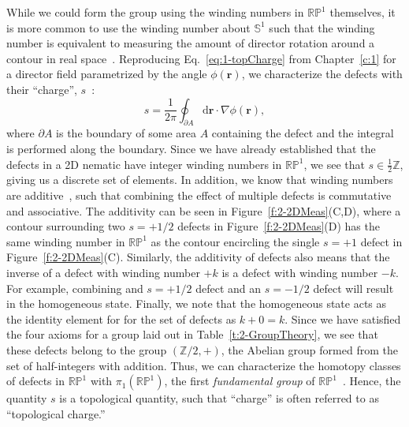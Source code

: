 While we could form the group using the winding numbers in $\mathbb{R}\mathbb{P}^1$ themselves, it is more common to use the winding number about $\mathbb{S}^1$ such that the winding number is equivalent to measuring the amount of director rotation around a contour in real space~\cite{RN23,RN153,RN203}.
Reproducing Eq.~\ref{eq:1-topCharge} from Chapter~\ref{c:1} for a director field parametrized by the angle $\phi(\mathbf{r})$, we characterize the defects with their ``charge'', $s$~\cite{RN153,RN236}:
\begin{equation}
  s = \frac{1}{2 \pi}\oint_{\partial A} \textrm{d}\mathbf{r} \cdot \nabla\phi(\mathbf{r}),\label{eq:2-topCharge}
\end{equation}
where $\partial A$ is the boundary of some area $A$ containing the defect and the integral is performed along the boundary.
Since we have already established that the defects in a 2D nematic have integer winding numbers in $\mathbb{R}\mathbb{P}^1$, we see that $s \in \frac{1}{2} \mathbb{Z}$, giving us a discrete set of elements.
In addition, we know that winding numbers are additive~\cite{RN196}, such that combining the effect of multiple defects is commutative and associative.
The additivity can be seen in Figure~\ref{f:2-2DMeas}(C,D), where a contour surrounding two $s = +1/2$ defects in Figure~\ref{f:2-2DMeas}(D) has the same winding number in $\mathbb{R}\mathbb{P}^1$ as the contour encircling the single $s = +1$ defect in Figure~\ref{f:2-2DMeas}(C).
Similarly, the additivity of defects also means that the inverse of a defect with winding number $+k$ is a defect with winding number $-k$.
For example, combining and $s = +1/2$ defect and an $s = -1/2$ defect will result in the homogeneous state.
Finally, we note that the homogeneous state acts as the identity element for for the set of defects as $k + 0 = k$.
Since we have satisfied the four axioms for a group laid out in Table~\ref{t:2-GroupTheory}, we see that these defects belong to the group $(\mathbb{Z}/2, +)$, the Abelian group formed from the set of half-integers with addition.
Thus, we can characterize the homotopy classes of defects in $\mathbb{R}\mathbb{P}^1$ with $\pi_1 (\mathbb{R}\mathbb{P}^1)$, the first \emph{fundamental group} of $\mathbb{R}\mathbb{P}^1$~\cite{RN196,RN153,RN236}.
Hence, the quantity $s$ is a topological quantity, such that ``charge'' is often referred to as ``topological charge.'' \\


